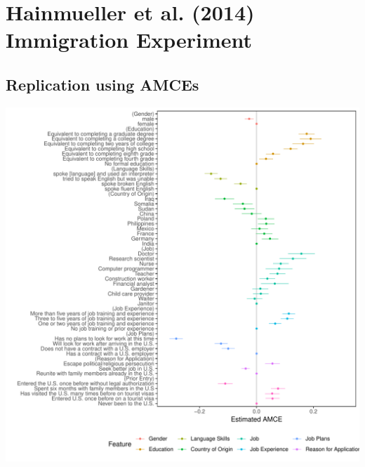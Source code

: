 \documentclass[a4paper,12pt]{article}\usepackage[]{graphicx}\usepackage[]{color}
\makeatletter
\def\maxwidth{ %
  \ifdim\Gin@nat@width>\linewidth
    \linewidth
  \else
    \Gin@nat@width
  \fi
}
\newenvironment{knitrout}{}{} %
\makeatother
\begin{document}
\clearpage

\section{Hainmueller et al. (2014) Immigration Experiment}

\subsection{Replication using AMCEs}

\begin{knitrout}
\color{fgcolor}
\includegraphics[width=\maxwidth]{figure/hainmueller_immigration_amce_appendix-1} 

\end{knitrout}

\clearpage
\end{document}
